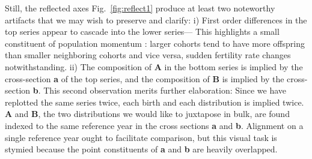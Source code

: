 \documentclass{article}
\begin{document}
Still, the reflected axes Fig.~\ref{fig:reflect1} produce at least two noteworthy artifacts that we may wish to preserve and clarify: i) First order differences in the top series appear to cascade into the lower series--- This highlights a small constituent of population momentum \citep{keyfitz1971momentum}: larger cohorts tend to have more offspring than smaller neighboring cohorts and vice versa, sudden fertility rate changes notwithstanding. ii) The composition of \textbf{A} in the bottom series is implied by the cross-section \textbf{a} of the top series, and the composition of \textbf{B} is implied by the cross-section \textbf{b}. This second observation merits further elaboration: Since we have replotted the same series twice, each birth and each distribution is implied twice. \textbf{A} and \textbf{B}, the two distributions we would like to juxtapose in bulk, are found indexed to the same reference year in the cross sections \textbf{a} and \textbf{b}. Alignment on a single reference year ought to facilitate comparison, but this visual task is stymied because the point constituents of \textbf{a} and \textbf{b} are heavily overlapped. 
\end{document}
